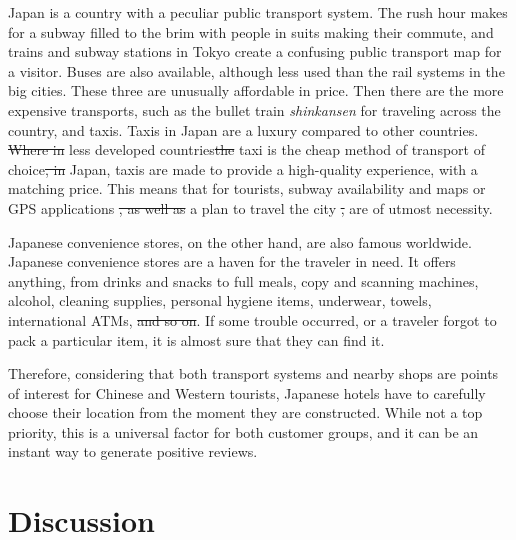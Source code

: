 \documentclass[smallextended,natbib]{svjour3}       %
\providecommand{\DIFadd}[1]{{\protect\color{blue}\uwave{#1}}} %
\providecommand{\DIFdel}[1]{{\protect\color{red}\sout{#1}}}                      %
\providecommand{\DIFaddbegin}{} %
\providecommand{\DIFaddend}{} %
\providecommand{\DIFdelbegin}{} %
\providecommand{\DIFdelend}{} %
\begin{document}
    Japan is a country with a peculiar public transport system. The rush hour makes for a subway filled to the brim with people in suits making their commute, and trains and subway stations in Tokyo create a confusing public transport map for a visitor. Buses are also available, although less used than the rail systems in the big cities. These three are unusually affordable in price. Then there are the more expensive transports, such as the bullet train \textit{shinkansen} for traveling across the country, and taxis. Taxis in Japan are a luxury compared to other countries. \DIFdelbegin \DIFdel{Where in }\DIFdelend \DIFaddbegin \DIFadd{In }\DIFaddend less developed countries\DIFdelbegin \DIFdel{the }\DIFdelend \DIFaddbegin \DIFadd{, a }\DIFaddend taxi is the cheap method of transport of choice\DIFdelbegin \DIFdel{, in }\DIFdelend \DIFaddbegin \DIFadd{. In }\DIFaddend Japan, taxis are made to provide a high-quality experience, with a matching price. This means that for tourists, subway availability and maps or GPS applications \DIFdelbegin \DIFdel{, as well as }\DIFdelend \DIFaddbegin \DIFadd{and }\DIFaddend a plan to travel the city \DIFdelbegin \DIFdel{, }\DIFdelend are of utmost necessity. 

    Japanese convenience stores, on the other hand, are also famous worldwide. Japanese convenience stores are a haven for the traveler in need. It offers anything, from drinks and snacks to full meals, copy and scanning machines, alcohol, cleaning supplies, personal hygiene items, underwear, towels, international ATMs, \DIFdelbegin \DIFdel{and so on}\DIFdelend \DIFaddbegin \DIFadd{among other things}\DIFaddend . If some trouble occurred, or a traveler forgot to pack a particular item, it is almost sure that they can find it. 

    Therefore, considering that both transport systems and nearby shops are points of interest for Chinese and Western tourists, Japanese hotels have to carefully choose their location from the moment they are constructed. While not a top priority, this is a universal factor for both customer groups, and it can be an instant way to generate positive reviews.

\section{Discussion}\label{discussion}
\end{document}
